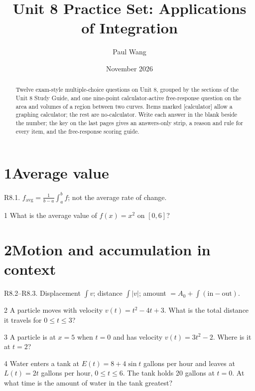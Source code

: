 \documentclass{apcalc}
\title{Unit 8 Practice Set: Applications of Integration}
\author{Paul Wang}
\date{November 2026}
\begin{document}
\maketitle
\begin{abstract}
Twelve exam-style multiple-choice questions on Unit 8, grouped by the sections of the Unit 8 Study Guide, and one nine-point calculator-active free-response question on the area and volumes of a region between two curves. Items marked [calculator] allow a graphing calculator; the rest are no-calculator. Write each answer in the blank beside the number; the key on the last pages gives an answers-only strip, a reason and rule for every item, and the free-response scoring guide.
\end{abstract}
\section*{1\quad Average value}
\begin{setrule}R8.1. $f_{\text{avg}}=\frac{1}{b-a}\int_a^bf$; not the average rate of change.\end{setrule}
\begin{q}{1}
What is the average value of $f(x)=x^2$ on $[0,6]$?
\end{q}
\section*{2\quad Motion and accumulation in context}
\begin{setrule}R8.2–R8.3. Displacement $\int v$; distance $\int|v|$; amount $=A_0+\int(\text{in}-\text{out})$.\end{setrule}
\begin{q}{2}
A particle moves with velocity $v(t)=t^2-4t+3$. What is the total distance it travels for $0\le t\le3$?
\end{q}
\begin{q}{3}
A particle is at $x=5$ when $t=0$ and has velocity $v(t)=3t^2-2$. Where is it at $t=2$?
\end{q}
\begin{q}{4}
Water enters a tank at $E(t)=8+4\sin t$ gallons per hour and leaves at $L(t)=2t$ gallons per hour, $0\le t\le6$. The tank holds 20 gallons at $t=0$. At what time is the amount of water in the tank greatest?\calcmark
{}
\end{q}
\end{document}
